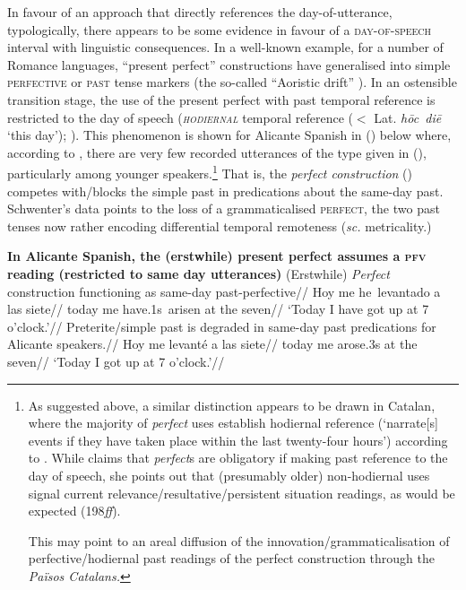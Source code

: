 In favour of an approach that directly references the day-of-utterance, typologically, there appears to be some evidence in favour of a \textsc{day-of-speech} interval with linguistic consequences. In a well-known example, for a number of Romance languages, ``present perfect'' constructions have generalised into simple \textsc{perfective} or \textsc{past} tense markers (the so-called ``Aoristic drift'' \citealp[see][]{Schaden2009,Schaden2012}). In an ostensible transition stage, the use of the present perfect with past temporal reference is restricted to the day of speech (\textit{\textsc{hodiernal}} temporal reference ($ < $ Lat. \textit{hōc~diē} `this day');\label{hod} \citealp{Comrie1985,Dahl1985}). This phenomenon is shown for Alicante Spanish in (\nextx) below where, according to \cite{Schwenter1994}, there are very few recorded utterances of the type given in (), particularly among younger speakers.\footnote{
	As suggested above, a similar distinction appears to be drawn in Catalan, where the majority of \textit{perfect} uses establish hodiernal reference (`narrate[s] events if they have taken place within the last twenty-four hours') according to \citet[236--7]{CurelliGotor1990}. While \citeauthor{CurelliGotor1990} claims that \textit{perfect}s are obligatory if making past reference to the day of speech, she points out that (presumably older) non-hodiernal uses signal current relevance/resultative/persistent situation readings, as would be expected  (198\textit{ff}). 
	
	This may point to an areal diffusion of the innovation/grammaticalisation of perfective/hodiernal past readings of the perfect construction through the \textit{Països Catalans.}} That is, the \textit{perfect construction} () competes with/blocks the simple past in predications about the same-day past. Schwenter's data points to the loss of a grammaticalised \textsc{perfect}, the two past tenses now rather encoding differential temporal remoteness (\textit{sc.} metricality.)

\pex\textbf{In Alicante Spanish, the (erstwhile) present perfect assumes a \textsc{pfv} reading (restricted to same day utterances)}
\a\begingl\glpreamble \textmd{(Erstwhile) \textit{Perfect} construction functioning as same-day past-perfective}//
\gla Hoy me he~levantado a las siete//
\glb today me have.1s~arisen at the seven//
\glft`Today I have got up at 7 o'clock.'//\endgl
\a\begingl\glpreamble Preterite/simple past is degraded in same-day past predications for Alicante speakers.//
\gla\ljudge{$ ^{*\%} $}Hoy me levanté a las siete//
\glb today me arose.3s at the seven//
\glft`Today I got up at 7 o'clock.'//\endgl\xe


